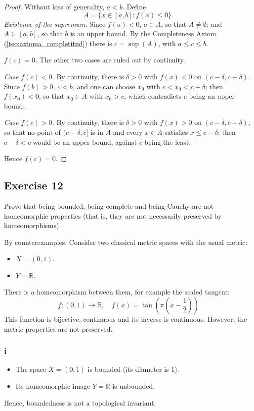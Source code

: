 \documentclass[11pt, a4paper]{article}
\begin{document}
\begin{proof}
Without loss of generality, $a < b$. Define
$$ A = \{ x \in [a, b] : f(x) \le 0 \}. $$
\textit{Existence of the supremum.} Since $f(a) < 0$, $a \in A$, so that $A \neq \emptyset$; and
$A \subseteq [a, b]$, so that $b$ is an upper bound. By the Completeness Axiom
(\ref{teo:axioma_completitud}) there is $c = \sup(A)$, with $a \le c \le b$.

\textit{$f(c) = 0$.} The other two cases are ruled out by continuity.

\textit{Case $f(c) < 0$.} By continuity, there is $\delta > 0$ with $f(x) < 0$ on
$(c - \delta, c + \delta)$. Since $f(b) > 0$, $c < b$, and one can choose $x_0$ with
$c < x_0 < c + \delta$; then $f(x_0) < 0$, so that $x_0 \in A$ with $x_0 > c$, which contradicts
$c$ being an upper bound.

\textit{Case $f(c) > 0$.} By continuity, there is $\delta > 0$ with $f(x) > 0$ on
$(c - \delta, c + \delta)$, so that no point of $(c - \delta, c]$ is in $A$ and every $x \in A$
satisfies $x \le c - \delta$; then $c - \delta < c$ would be an upper bound, against $c$ being the
least.

Hence $f(c) = 0$.
\end{proof}

\subsection*{Exercise 12}

Prove that being bounded, being complete and being Cauchy are not homeomorphic properties (that is, they are not
necessarily preserved by homeomorphisms).

By counterexamples. Consider two classical metric spaces with the usual metric:
\begin{itemize}
    \item $X = (0, 1)$.
    \item $Y = \mathbb{R}$.
\end{itemize}
There is a homeomorphism between them, for example the scaled tangent:
$$ f: (0, 1) \to \mathbb{R}, \quad f(x) = \tan\left( \pi \left( x - \frac{1}{2} \right) \right) $$
This function is bijective, continuous and its inverse is continuous. However, the metric properties
are not preserved.

\subsubsection*{i}
\begin{itemize}
    \item The space $X = (0, 1)$ is bounded (its diameter is 1).
    \item Its homeomorphic image $Y = \mathbb{R}$ is unbounded.
\end{itemize}
Hence, boundedness is not a topological invariant.
\end{document}
